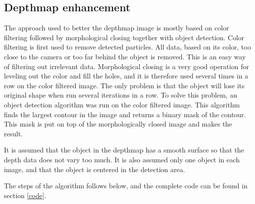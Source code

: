 

\subsection{Depthmap enhancement} \label{section:depthmap}

The approach used to better the depthmap image is mostly based on color filtering followed by morphological closing together with object detection. 
Color filtering is first used to remove detected particles. All data, based on its color, too close to the camera or too far behind the object is removed. This is an easy way of filtering out irrelevant data. Morphological closing is a very good operation for leveling out the color and fill the holes, and it is therefore used several times in a row on the color filtered image. The only problem is that the object will lose its original shape when run several iterations in a row. To solve this problem, an object detection algorithm was run on the color filtered image. This algorithm finds the largest contour in the image and returns a binary mask of the contour. This mask is put on top of the morphologically closed image and makes the result.

It is assumed that the object in the depthmap has a smooth surface so that the depth data does not vary too much. It is also assumed only one object in each image, and that the object is centered in the detection area.

The steps of the algorithm follows below, and the complete code can be found in section \ref{code}.

